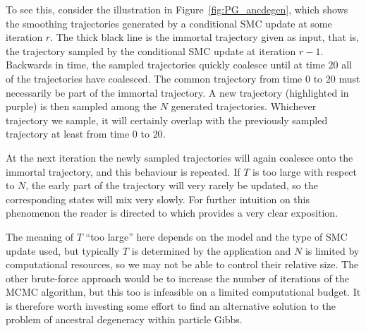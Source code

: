 To see this, consider the illustration in Figure~\ref{fig:PG_ancdegen}, which shows the smoothing trajectories generated by a conditional SMC update at some iteration $r$. The thick black line is the immortal trajectory given as input, that is, the trajectory sampled by the conditional SMC update at iteration $r-1$. Backwards in time, the sampled trajectories quickly coalesce until at time $20$ all of the trajectories have coalesced. The common trajectory from time $0$ to $20$ must necessarily be part of the immortal trajectory.
A new trajectory (highlighted in purple) is then sampled among the $N$ generated trajectories. Whichever trajectory we sample, it will certainly overlap with the previously sampled trajectory at least from time $0$ to $20$.

At the next iteration the newly sampled trajectories will again coalesce onto the immortal trajectory, and this behaviour is repeated. 
If $T$ is too large with respect to $N$, the early part of the trajectory will very rarely be updated, so the corresponding states will mix very slowly.
For further intuition on this phenomenon the reader is directed to \textcite[Section 5.4]{lindsten2013} which provides a very clear exposition.

The meaning of $T$ ``too large'' here depends on the model and the type of SMC update used, but typically $T$ is determined by the application and $N$ is limited by computational resources, so we may not be able to control their relative size. The other brute-force approach would be to increase the number of iterations of the MCMC algorithm, but this too is infeasible on a limited computational budget.
It is therefore worth investing some effort to find an alternative solution to the problem of ancestral degeneracy within particle Gibbs.

